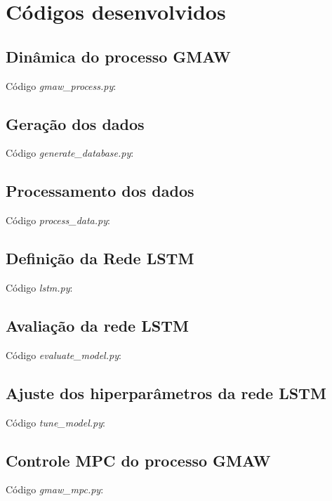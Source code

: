 \chapter{Códigos desenvolvidos}
\label{appendice}
\section{Dinâmica do processo GMAW}\label{code:gmaw_process}
Código \textit{gmaw\_process.py}:
{\small }


\section{Geração dos dados}\label{code:generate_database}
Código \textit{generate\_database.py}:
{\small }

\section{Processamento dos dados}\label{code:process_data}
Código \textit{process\_data.py}:
{\small }

\section{Definição da Rede LSTM}\label{code:lstm}
Código \textit{lstm.py}:
{\small }

\newpage

\section{Avaliação da rede LSTM}\label{code:evaluate_model}
Código \textit{evaluate\_model.py}:
{\small }

\section{Ajuste dos hiperparâmetros da rede LSTM}\label{code:tune_model}
Código \textit{tune\_model.py}:
{\small }

\section{Controle MPC do processo GMAW}\label{code:gmaw_mpc}
Código \textit{gmaw\_mpc.py}:
{\small }
